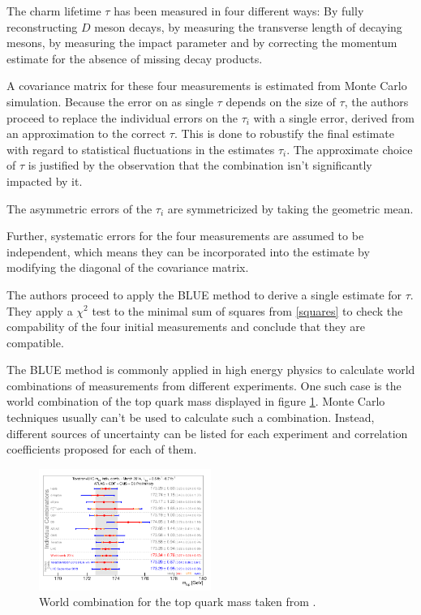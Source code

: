 The charm lifetime $τ$ has been measured in four different ways: By fully reconstructing $D$ meson decays, by measuring the transverse length of decaying mesons, by measuring the impact parameter and by correcting the momentum estimate for the absence of missing decay products.

A covariance matrix for these four measurements is estimated from Monte Carlo simulation.
Because the error on as single $τ$ depends on the size of $τ$, the authors proceed to replace the individual errors on the $τ_i$ with a single error, derived from an approximation to the correct $τ$.
This is done to robustify the final estimate with regard to statistical fluctuations in the estimates $τ_i$.
The approximate choice of $τ$ is justified by the observation that the combination isn't significantly impacted by it.

The asymmetric errors of the $τ_i$ are symmetricized by taking the geometric mean.

Further, systematic errors for the four measurements are assumed to be independent, which means they can be incorporated into the estimate by modifying the diagonal of the covariance matrix.

The authors proceed to apply the BLUE method to derive a single estimate for $τ$.
They apply a $χ^2$ test to the minimal sum of squares from \eqref{squares} to check the compability of the four initial measurements and conclude that they are compatible.

The BLUE method is commonly applied in high energy physics to calculate world combinations of measurements from different experiments.
One such case is the world combination of the top quark mass displayed in figure \ref{world}.
Monte Carlo techniques usually can't be used to calculate such a combination.
Instead, different sources of uncertainty can be listed for each experiment and correlation coefficients proposed for each of them.

\begin{figure}
  \includegraphics[width=0.5\textwidth]{./figures/world.pdf}
  \caption{World combination for the top quark mass taken from \cite{atlas}.}
  \label{world}
\end{figure}

\vspace{1em}

\nocite{*}
\printbibliography


